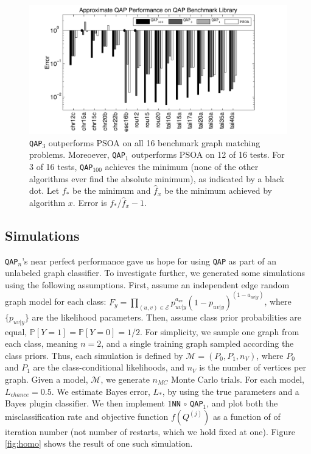 \documentclass{article} %
\newcommand{\PP}{\mathbb{P}}           %
\providecommand{\mc}[1]{\mathcal{#1}}
\providecommand{\mh}[1]{\hat{#1}}
\newcommand{\qap}{\texttt{QAP} }
\newcommand{\qapa}{\texttt{QAP}$_1$ }
\newcommand{\qapb}{\texttt{QAP$_{100}$} }
\begin{document}
\begin{figure}[htbp]
	\centering			
	\includegraphics[width=1.0\linewidth]{../figs/benchmarks.pdf}
	\caption{\texttt{QAP}$_3$ outperforms PSOA on all 16 benchmark graph matching problems.  Moreoever, \qapa outperforms PSOA on 12 of 16 tests.  For 3 of 16 tests, \qapb achieves the minimum (none of the other algorithms ever find the absolute minimum), as indicated by a black dot.  Let $f_*$ be the minimum and $\mh{f}_x$ be the minimum achieved by algorithm $x$.  Error is $f_*/\mh{f}_x-1$.  }
	\label{fig:fwpath}
\end{figure}




\subsection{Simulations}

\texttt{QAP}$_n$'s near perfect performance gave us hope for using \qap as part of an unlabeled graph classifier.  To investigate further, we generated some simulations using the following assumptions.  First, assume an independent edge random graph model for each class: $F_y=\prod_{(u,v) \in \mc{E}}p_{uv|y}^{a_{uv}} (1-p_{uv|y})^{(1-a_{uv|y})}$, where $\{p_{uv|y}\}$ are the likelihood parameters.  Then, assume class prior probabilities are equal, $\PP[Y=1]=\PP[Y=0]=1/2$.  For simplicity, we sample one graph from each class, meaning $n=2$, and a single training graph sampled according the class priors. Thus, each simulation is defined by $\mc{M}=(P_0,P_1,n_V)$, where $P_0$ and $P_1$ are the class-conditional likelihoods, and $n_V$ is the number of vertices per graph.  Given a model, $\mc{M}$, we generate $n_{MC}$ Monte Carlo trials.  For each model, $L_{chance}=0.5$.  We estimate Bayes error, $L_*$, by using the true parameters and a Bayes plugin classifier.  We then implement \texttt{$1$NN} $\circ$ \texttt{QAP}$_1$, and plot both the misclassification rate and objective function $f(Q^{(j)})$ as a function of of iteration number (not number of restarts, which we hold fixed at one). Figure \ref{fig:homo} shows the result of one such simulation.  
\end{document}

